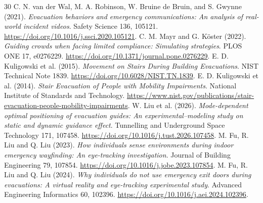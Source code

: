 \documentclass[11pt,a4paper]{article}
\begin{document}
\begin{thebibliography}{30}
 C. N. van der Wal, M. A. Robinson, W. Bruine de Bruin, and S. Gwynne (2021). \emph{Evacuation behaviors and emergency communications: An analysis of real-world incident videos}. Safety Science 136, 105121. \url{https://doi.org/10.1016/j.ssci.2020.105121}.
 C. M. Mayr and G. K\"oster (2022). \emph{Guiding crowds when facing limited compliance: Simulating strategies}. PLOS ONE 17, e0276229. \url{https://doi.org/10.1371/journal.pone.0276229}.
 E. D. Kuligowski et al. (2015). \emph{Movement on Stairs During Building Evacuations}. NIST Technical Note 1839. \url{https://doi.org/10.6028/NIST.TN.1839}.
 E. D. Kuligowski et al. (2014). \emph{Stair Evacuation of People with Mobility Impairments}. National Institute of Standards and Technology. \url{https://www.nist.gov/publications/stair-evacuation-people-mobility-impairments}.
 W. Liu et al. (2026). \emph{Mode-dependent optimal positioning of evacuation guides: An experimental--modeling study on static and dynamic guidance effect}. Tunnelling and Underground Space Technology 171, 107458. \url{https://doi.org/10.1016/j.tust.2026.107458}.
 M. Fu, R. Liu and Q. Liu (2023). \emph{How individuals sense environments during indoor emergency wayfinding: An eye-tracking investigation}. Journal of Building Engineering 79, 107854. \url{https://doi.org/10.1016/j.jobe.2023.107854}.
 M. Fu, R. Liu and Q. Liu (2024). \emph{Why individuals do not use emergency exit doors during evacuations: A virtual reality and eye-tracking experimental study}. Advanced Engineering Informatics 60, 102396. \url{https://doi.org/10.1016/j.aei.2024.102396}.
\end{thebibliography}
\end{document}
